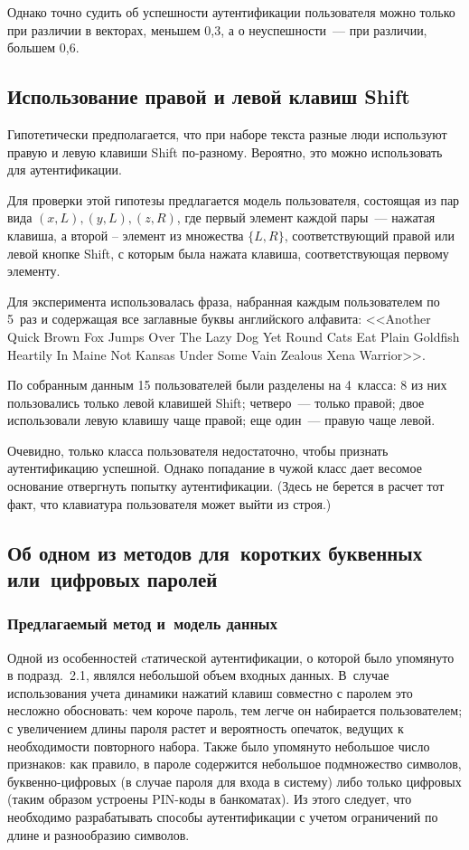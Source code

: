 \begin{multicols}{2}
Однако точно судить об успешности аутентификации пользователя можно
только при различии в векторах, меньшем 0,3, а о неуспешности~--- при
различии, большем 0,6.

\subsection{Использование правой и левой клавиш {\sf Shift}}\label{shift}

Гипотетически предполагается, что при наборе текста разные люди
используют правую и левую клавиши {\sf Shift} по-разному.
Вероятно, это можно использовать для аутентификации.

Для проверки этой гипотезы предлагается модель пользователя,
состоящая из пар вида $(x, L), (y, L), (z, R)$, где первый элемент
каждой пары~--- нажатая клавиша, а второй -- элемент из множества
$\{L,R\}$, соответствующий правой или левой кнопке {\sf Shift}, с
которым была нажата клавиша, соответствующая первому элементу.

Для эксперимента использовалась фраза, набранная каждым
пользователем по 5~раз и содержащая все заглавные буквы английского
алфавита: <<{\sf Another Quick Brown Fox Jumps Over The Lazy Dog
Yet Round Cats Eat Plain Goldfish Heartily In Maine Not Kansas Under
Some Vain Zealous Xena Warrior}>>.

По собранным данным 15 пользователей были разделены на 4~класса: 8 из них
 пользовались только левой клавишей {\sf Shift}; четверо~---
только правой; двое использовали левую клавишу чаще правой; еще
один~--- правую чаще левой.

Очевидно, только класса пользователя недостаточно, чтобы признать
аутентификацию успешной. Однако попадание в чужой класс дает весомое
основание отвергнуть попытку аутентификации. (Здесь не берется в
расчет тот факт, что клавиатура пользователя может выйти из строя.)




\subsection{Об одном из методов для~коротких буквенных или~цифровых паролей}

\subsubsection{Предлагаемый метод и~модель данных}

Одной из особенностей cтатической аутентификации, о которой было
упомянуто в подразд.~2.1, являлся небольшой объем входных данных. 
В~случае использования учета динамики нажатий клавиш совместно с
паролем это несложно обосновать: чем короче пароль, тем легче он
набирается пользователем; с увеличением длины пароля растет и
вероятность опечаток, ведущих к необходимости повторного набора.
Также было упомянуто небольшое число признаков: как правило, в
пароле содержится небольшое подмножество символов, бук\-вен\-но-циф\-ро\-вых
(в случае пароля для входа в сис\-те\-му) либо только цифровых (таким
образом устроены PIN-ко\-ды в банкоматах). Из этого следует, что
необходимо разрабатывать способы аутентификации с учетом ограничений
по длине и разнообразию символов.


\end{multicols}
